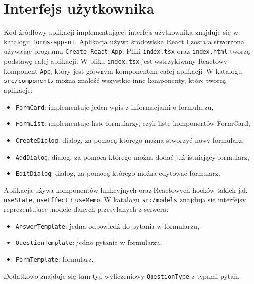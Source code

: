 \section{Interfejs użytkownika}
Kod źródłowy aplikacji implementującej interfejs użytkownika znajduje się w katalogu
\texttt{forms-app-ui}. Aplikacja używa środowiska React i została stworzona używając programu
\texttt{Create React App}. Pliki \texttt{index.tsx} oraz \texttt{index.html}
tworzą podstawę całej aplikacji. W pliku \texttt{index.tsx} jest wstrzykiwany Reactowy
komponent \texttt{App}, który jest głównym komponentem całej aplikacji. W katalogu 
\texttt{src/components} można znaleźć wszystkie inne komponenty, które tworzą aplikację:
\begin{itemize}
  \item \texttt{FormCard}: implementuje jeden wpis z informacjami o formularzu,
  \item \texttt{FormList}: implementuje listę formularzy, czyli listę komponentów FormCard,
  \item \texttt{CreateDialog}: dialog, za pomocą którego można stworzyć nowy formularz,
  \item \texttt{AddDialog}: dialog, za pomocą którego można dodać już istniejący formularz,
  \item \texttt{EditDialog}: dialog, za pomocą którego można edytować formularz.
\end{itemize}
Aplikacja używa komponentów funkcyjnych oraz Reactowych hooków takich jak \texttt{useState},
\texttt{useEffect} i \texttt{useMemo}. W katalogu \texttt{src/models} znajdują się interfejsy
reprezentujące modele danych przesyłanych z serwera:
\begin{itemize}
  \item \texttt{AnswerTemplate}: jedna odpowiedź do pytania w formularzu,
  \item \texttt{QuestionTemplate}: jedno pytanie w formularzu,
  \item \texttt{FormTemplate}: formularz.
\end{itemize}
Dodatkowo znajduje się tam typ wyliczeniowy \texttt{QuestionType} z typami pytań.

